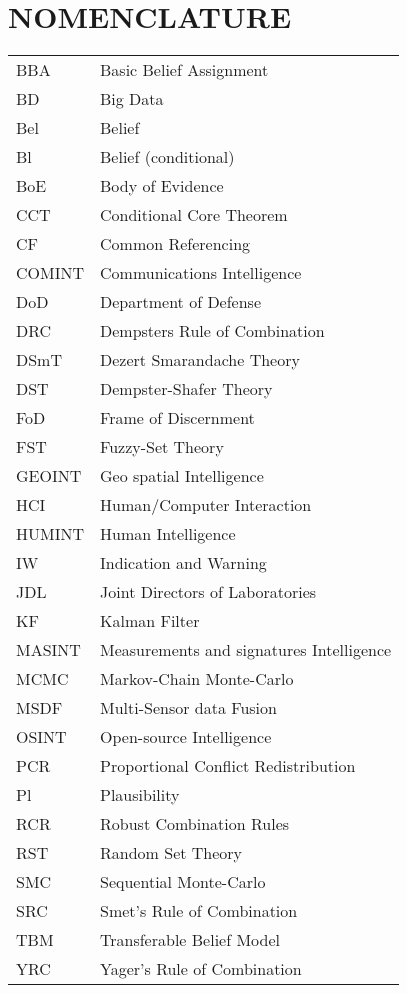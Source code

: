 %
%
%


\chapter*{NOMENCLATURE}
\begin{table}
\begin{tabular}{ll}
BBA  & Basic Belief Assignment\tabularnewline
BD & Big Data \tabularnewline
Bel  & Belief\tabularnewline
Bl & Belief (conditional) \tabularnewline
BoE  & Body of Evidence\tabularnewline
CCT   & Conditional Core Theorem\tabularnewline
CF & Common Referencing\tabularnewline
COMINT & Communications Intelligence \tabularnewline
DoD & Department of Defense \tabularnewline
DRC & Dempsters Rule of Combination \tabularnewline
DSmT & Dezert Smarandache Theory \tabularnewline
DST & Dempster-Shafer Theory \tabularnewline
FoD & Frame of Discernment \tabularnewline
FST & Fuzzy-Set Theory \tabularnewline
GEOINT & Geo spatial Intelligence \tabularnewline
HCI &  Human/Computer Interaction \tabularnewline
HUMINT & Human Intelligence \tabularnewline
IW & Indication and Warning \tabularnewline
JDL & Joint Directors of Laboratories \tabularnewline
KF & Kalman Filter \tabularnewline
MASINT & Measurements and signatures Intelligence \tabularnewline
MCMC & Markov-Chain Monte-Carlo \tabularnewline
MSDF & Multi-Sensor data Fusion \tabularnewline
OSINT & Open-source Intelligence \tabularnewline
PCR & Proportional Conflict Redistribution \tabularnewline
Pl & Plausibility \tabularnewline 
RCR & Robust Combination Rules \tabularnewline
RST & Random Set Theory \tabularnewline
SMC & Sequential Monte-Carlo \tabularnewline
SRC & Smet's Rule of Combination \tabularnewline
TBM & Transferable Belief Model\tabularnewline
YRC & Yager's Rule of Combination \tabularnewline
\end{tabular}
\end{table}



\pagebreak{}